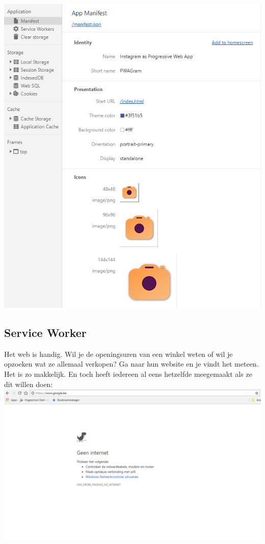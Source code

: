 	\includegraphics[scale=0.5]{img/manifestDev.png}



\subsection{Service Worker}
Het web is handig. Wil je de openingsuren van een winkel weten of wil je opzoeken wat ze allemaal verkopen? Ga naar hun website en je vindt het meteen. Het is zo makkelijk. En toch heeft iedereen al eens hetzelfde meegemaakt als ze dit willen doen: \\

\includegraphics[scale=0.5]{img/noInternet.png}


